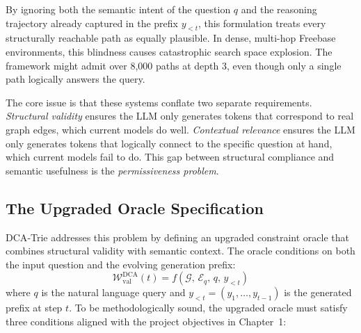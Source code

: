 By ignoring both the semantic intent of the question $q$ and the reasoning trajectory already captured in the prefix $y_{<t}$, this formulation treats every structurally reachable path as equally plausible. In dense, multi-hop Freebase environments, this blindness causes catastrophic search space explosion. The framework might admit over 8,000 paths at depth 3, even though only a single path logically answers the query.

The core issue is that these systems conflate two separate requirements. \textit{Structural validity} ensures the LLM only generates tokens that correspond to real graph edges, which current models do well. \textit{Contextual relevance} ensures the LLM only generates tokens that logically connect to the specific question at hand, which current models fail to do. This gap between structural compliance and semantic usefulness is the \textit{permissiveness problem}.

\subsection{The Upgraded Oracle Specification}

DCA‑Trie addresses this problem by defining an upgraded constraint oracle that combines structural validity with semantic context. The oracle conditions on both the input question and the evolving generation prefix:
\begin{equation}
  \mathcal{W}_{\text{val}}^{\text{DCA}}(t) = f(\mathcal{G},\, \mathcal{E}_q,\,
  q,\, y_{<t})
  \label{eq:dca_oracle}
\end{equation}
where $q$ is the natural language query and $y_{<t} = (y_1, \ldots, y_{t-1})$ is the generated prefix at step $t$. To be methodologically sound, the upgraded oracle must satisfy three conditions aligned with the project objectives in Chapter~1:

